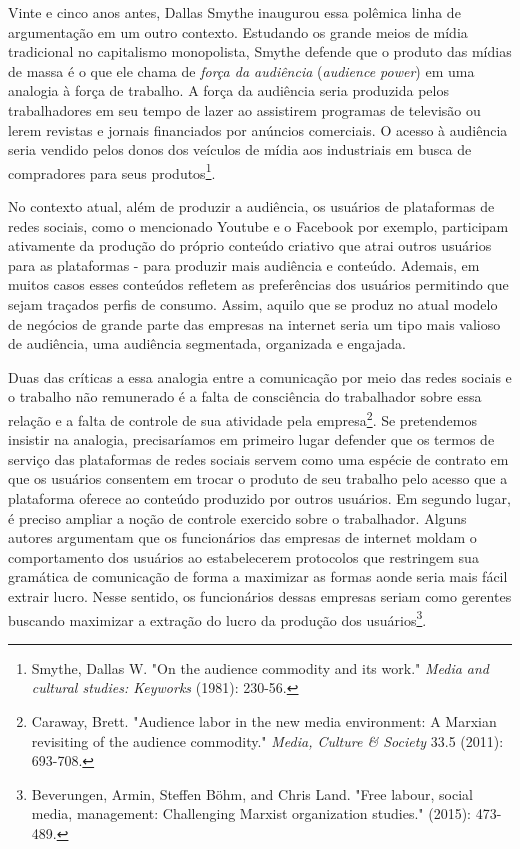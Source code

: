 Vinte e cinco anos antes, Dallas Smythe inaugurou essa polêmica linha de
argumentação em um outro contexto. Estudando os grande meios de mídia
tradicional no capitalismo monopolista, Smythe defende que o produto das
mídias de massa é o que ele chama de \emph{força da audiência}
(\emph{audience power}) em uma analogia à força de trabalho. A força da
audiência seria produzida pelos trabalhadores em seu tempo de lazer ao
assistirem programas de televisão ou lerem revistas e jornais
financiados por anúncios comerciais. O acesso à audiência seria vendido
pelos donos dos veículos de mídia aos industriais em busca de
compradores para seus produtos\footnote{Smythe, Dallas
  W. "On the audience commodity and its work." \emph{Media and cultural
  studies: Keyworks} (1981): 230-56.}.

No contexto atual, além de produzir a audiência, os usuários de
plataformas de redes sociais, como o mencionado Youtube e o Facebook por
exemplo, participam ativamente da produção do próprio conteúdo criativo
que atrai outros usuários para as plataformas - para produzir mais
audiência e conteúdo. Ademais, em muitos casos esses conteúdos refletem
as preferências dos usuários permitindo que sejam traçados perfis de
consumo. Assim, aquilo que se produz no atual modelo de negócios de
grande parte das empresas na internet seria um tipo mais valioso de
audiência, uma audiência segmentada, organizada e engajada.

Duas das críticas a essa analogia entre a comunicação por meio das redes
sociais e o trabalho não remunerado é a falta de consciência do
trabalhador sobre essa relação e a falta de controle de sua atividade
pela empresa\footnote{Caraway, Brett. "Audience labor
  in the new media environment: A Marxian revisiting of the audience
  commodity." \emph{Media, Culture \& Society} 33.5 (2011): 693-708.}.
Se pretendemos insistir na analogia, precisaríamos em primeiro lugar
defender que os termos de serviço das plataformas de redes sociais
servem como uma espécie de contrato em que os usuários consentem em
trocar o produto de seu trabalho pelo acesso que a plataforma oferece ao
conteúdo produzido por outros usuários. Em segundo lugar, é preciso
ampliar a noção de controle exercido sobre o trabalhador. Alguns autores
argumentam que os funcionários das empresas de internet moldam o
comportamento dos usuários ao estabelecerem protocolos que restringem
sua gramática de comunicação de forma a maximizar as formas aonde seria
mais fácil extrair lucro. Nesse sentido, os funcionários dessas empresas
seriam como gerentes buscando maximizar a extração do lucro da produção
dos usuários\footnote{Beverungen, Armin, Steffen Böhm,
  and Chris Land. "Free labour, social media, management: Challenging
  Marxist organization studies." (2015): 473-489.}.


